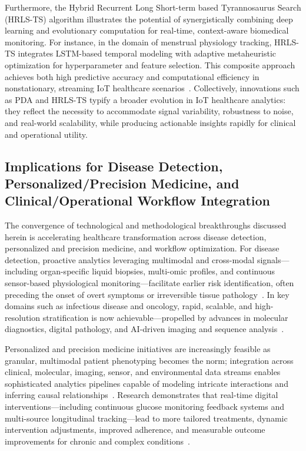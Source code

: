 Furthermore, the Hybrid Recurrent Long Short-term based Tyrannosaurus Search (HRLS-TS) algorithm illustrates the potential of synergistically combining deep learning and evolutionary computation for real-time, context-aware biomedical monitoring. For instance, in the domain of menstrual physiology tracking, HRLS-TS integrates LSTM-based temporal modeling with adaptive metaheuristic optimization for hyperparameter and feature selection. This composite approach achieves both high predictive accuracy and computational efficiency in nonstationary, streaming IoT healthcare scenarios~\cite{ref107}. Collectively, innovations such as PDA and HRLS-TS typify a broader evolution in IoT healthcare analytics: they reflect the necessity to accommodate signal variability, robustness to noise, and real-world scalability, while producing actionable insights rapidly for clinical and operational utility.

\subsection{Implications for Disease Detection, Personalized/Precision Medicine, and Clinical/Operational Workflow Integration}

The convergence of technological and methodological breakthroughs discussed herein is accelerating healthcare transformation across disease detection, personalized and precision medicine, and workflow optimization. For disease detection, proactive analytics leveraging multimodal and cross-modal signals—including organ-specific liquid biopsies, multi-omic profiles, and continuous sensor-based physiological monitoring—facilitate earlier risk identification, often preceding the onset of overt symptoms or irreversible tissue pathology~\cite{ref21,ref51,ref63,ref82,ref94}. In key domains such as infectious disease and oncology, rapid, scalable, and high-resolution stratification is now achievable—propelled by advances in molecular diagnostics, digital pathology, and AI-driven imaging and sequence analysis~\cite{ref18,ref25,ref41,ref51,ref52,ref53,ref62,ref63,ref66,ref67,ref105}.

Personalized and precision medicine initiatives are increasingly feasible as granular, multimodal patient phenotyping becomes the norm; integration across clinical, molecular, imaging, sensor, and environmental data streams enables sophisticated analytics pipelines capable of modeling intricate interactions and inferring causal relationships~\cite{ref28,ref29,ref31,ref33,ref35,ref38,ref49,ref54,ref60,ref63,ref65,ref94,ref104}. Research demonstrates that real-time digital interventions—including continuous glucose monitoring feedback systems and multi-source longitudinal tracking—lead to more tailored treatments, dynamic intervention adjustments, improved adherence, and measurable outcome improvements for chronic and complex conditions~\cite{ref27,ref90,ref95,ref101}.

